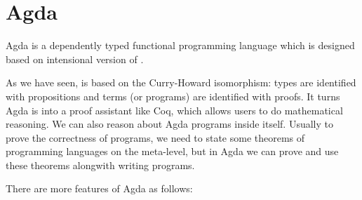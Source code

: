\section{Agda}



Agda is a dependently typed functional programming language which is designed based on intensional version
of \mltt{} \cite{agdawiki:main}. 

As we have seen, \mltt{} is based on the Curry-Howard
isomorphism: types are identified with propositions and terms (or programs) are identified with proofs. It turns Agda is into a proof assistant like Coq, which allows users to do mathematical reasoning. We can also reason about Agda programs inside itself.
Usually to prove the correctness of programs, we need to state some theorems of programming languages on the meta-level, but in Agda we can prove and use these theorems alongwith writing programs.

There are more features of Agda as follows:

